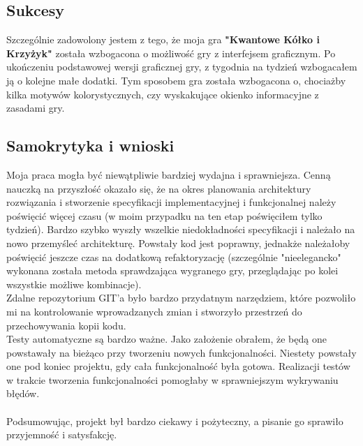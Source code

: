 \documentclass{article}
\begin{document}
\subsection{Sukcesy}
Szczególnie zadowolony jestem z tego, że moja gra \textbf{"Kwantowe Kółko i Krzyżyk"} została wzbogacona o możliwość gry z interfejsem graficznym. Po ukończeniu podstawowej wersji graficznej gry, z tygodnia na tydzień wzbogacałem ją o kolejne małe dodatki. Tym sposobem gra została wzbogacona o, chociażby kilka motywów kolorystycznych, czy wyskakujące okienko informacyjne z zasadami gry.

\subsection{Samokrytyka i wnioski}
Moja praca mogła być niewątpliwie bardziej wydajna i sprawniejsza. Cenną nauczką na przyszłość okazało się, że na okres planowania architektury rozwiązania i stworzenie specyfikacji implementacyjnej i funkcjonalnej należy poświęcić więcej czasu (w moim przypadku na ten etap poświęciłem tylko tydzień). Bardzo szybko wyszły wszelkie niedokładności specyfikacji i należało na nowo przemyśleć architekturę. Powstały kod jest poprawny, jednakże należałoby poświęcić jeszcze czas na dodatkową refaktoryzację (szczególnie "nieelegancko" wykonana została metoda sprawdzająca wygranego gry, przeglądając po kolei wszystkie możliwe kombinacje).\\
Zdalne repozytorium GIT'a było bardzo przydatnym narzędziem, które pozwoliło mi na kontrolowanie wprowadzanych zmian i stworzyło przestrzeń do przechowywania kopii kodu.\\
Testy automatyczne są bardzo ważne. Jako założenie obrałem, że będą one powstawały na bieżąco przy tworzeniu nowych funkcjonalności. Niestety powstały one pod koniec projektu, gdy cała funkcjonalność była gotowa. Realizacji testów w trakcie tworzenia funkcjonalności pomogłaby w sprawniejszym wykrywaniu błędów.\\\\
Podsumowując, projekt był bardzo ciekawy i pożyteczny, a pisanie go sprawiło przyjemność i satysfakcję.
\end{document}
